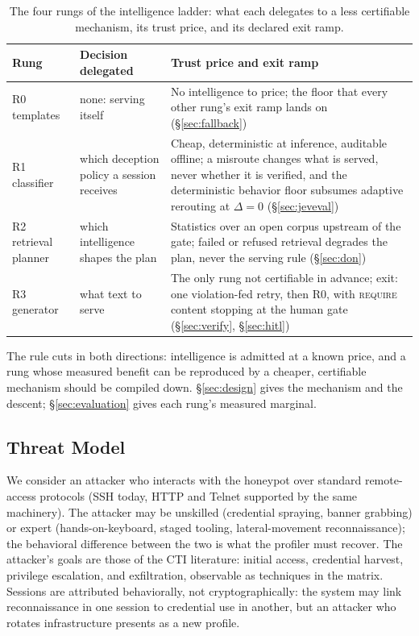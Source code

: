 \begin{table}[t]
\centering
\caption{The four rungs of the intelligence ladder: what each
delegates to a less certifiable mechanism, its trust price, and its
declared exit ramp.}
\label{tab:rungs}
\scriptsize
\setlength{\tabcolsep}{2.5pt}
\begin{tabular}{p{}p{}p{}}
\toprule
Rung & Decision delegated & Trust price and exit ramp \\
\midrule
R0 templates & none: serving itself & No intelligence to price; the floor that every other rung's exit ramp lands on (\S\ref{sec:fallback}) \\
R1 classifier & which deception policy a session receives & Cheap, deterministic at inference, auditable offline; a misroute changes what is served, never whether it is verified, and the deterministic behavior floor subsumes adaptive rerouting at $\Delta{=}0$ (\S\ref{sec:jeveval}) \\
R2 retrieval planner & which intelligence shapes the plan & Statistics over an open corpus upstream of the gate; failed or refused retrieval degrades the plan, never the serving rule (\S\ref{sec:don}) \\
R3 generator & what text to serve & The only rung not certifiable in advance; exit: one violation-fed retry, then R0, with \textsc{require} content stopping at the human gate (\S\ref{sec:verify}, \S\ref{sec:hitl}) \\
\bottomrule
\end{tabular}
\end{table}

The rule cuts in both directions: intelligence is admitted at a known
price, and a rung whose measured benefit can be reproduced by a
cheaper, certifiable mechanism should be compiled down.
\S\ref{sec:design} gives the mechanism and the descent;
\S\ref{sec:evaluation} gives each rung's measured marginal.

\subsection{Threat Model}
\label{sec:threat-model}
\label{sec:threatmodel}
We consider an attacker who interacts with the honeypot over standard
remote-access protocols (SSH today, HTTP and Telnet supported by the same
machinery). The attacker may be unskilled (credential spraying, banner
grabbing) or expert (hands-on-keyboard, staged tooling, lateral-movement
reconnaissance); the behavioral difference between the two is what the
profiler must recover. The attacker's goals are those of the CTI
literature: initial access, credential harvest, privilege escalation, and
exfiltration, observable as techniques in the \attck matrix. Sessions are
attributed behaviorally, not cryptographically: the system may link
reconnaissance in one session to credential use in another, but an
attacker who rotates infrastructure presents as a new profile.


